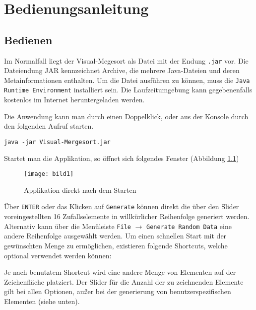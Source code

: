 \chapter{Bedienungsanleitung}\label{chap:bedienungsanleitung}


\section{Bedienen}

Im Normalfall liegt der Visual-Megesort als Datei mit der Endung \texttt{.jar} vor. Die Dateiendung JAR kennzeichnet Archive, die mehrere Java-Dateien und deren Metainformationen enthalten. Um die Datei ausführen zu können, muss die \texttt{Java Runtime Environment} installiert sein. Die Laufzeitumgebung kann gegebenenfalls kostenlos im Internet heruntergeladen werden.

Die Anwendung kann man durch einen Doppelklick, oder aus der Konsole durch den folgenden Aufruf starten.

\begin{verbatim}
java -jar Visual-Mergesort.jar
\end{verbatim}

Startet man die Applikation, so öffnet sich folgendes Fenster (Abbildung \ref{figure:start-app})

\begin{figure}[!htb]
    \centering
      \texttt{[image: bild1]}
    \caption{Applikation direkt nach dem Starten}
    \label{figure:start-app}
\end{figure}

Über \texttt{ENTER} oder das Klicken auf \texttt{Generate} können direkt die über den Slider voreingestellten 16 Zufallselemente in willkürlicher Reihenfolge generiert werden. Alternativ kann über die Menüleiste \texttt{File} $\rightarrow$ \texttt{Generate Random Data} eine andere Reihenfolge ausgewählt werden. Um einen schnellen Start mit der gewünschten Menge zu ermöglichen, existieren folgende Shortcuts, welche optional verwendet werden können:

Je nach benutztem Shortcut wird eine andere Menge von Elementen auf der Zeichenfläche platziert. Der Slider für die Anzahl der zu zeichnenden Elemente gilt bei allen Optionen, außer bei der generierung von benutzerspezifischen Elementen (siehe unten).

